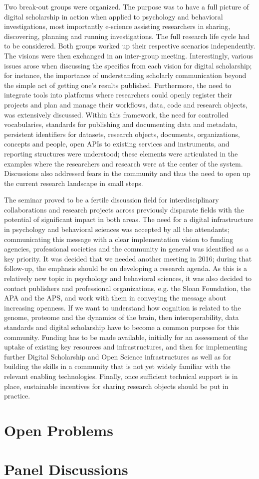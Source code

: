 \documentclass[a4paper,UKenglish]{dagrep}
\begin{document}
Two break-out groups were organized. The purpose was to have a full picture of
digital scholarship in action when applied to psychology and behavioral
investigations, most importantly e-science assisting researchers in sharing,
discovering, planning and running investigations. The full research life cycle
had to be considered. Both groups worked up their respective scenarios
independently. The visions were then exchanged in an inter-group meeting.
Interestingly, various issues arose when discussing the specifics from each
vision for digital scholarship; for instance, the importance of understanding
scholarly communication beyond the simple act of getting one's results
published. Furthermore, the need to integrate tools into platforms where
researchers could openly register their projects and plan and manage their
workflows, data, code and research objects, was extensively discussed. Within
this framework, the need for controlled vocabularies, standards for publishing
and documenting data and metadata, persistent identifiers for datasets, research
objects, documents, organizations, concepts and people, open APIs to existing
services and instruments, and reporting structures were understood; these
elements were articulated in the examples where the researchers and research
were at the center of the system. Discussions also addressed fears in the
community and thus the need to open up the current research landscape in small
steps.

The seminar proved to be a fertile discussion field for interdisciplinary
collaborations and research projects across previously disparate fields with the
potential of significant impact in both areas. The need for a digital
infrastructure in psychology and behavioral sciences was accepted by all the
attendants; communicating this message with a clear implementation vision to
funding agencies, professional societies and the community in general was
identified as a key priority. It was decided that we needed another meeting in
2016; during that follow-up, the emphasis should be on developing a research
agenda. As this is a relatively new topic in psychology and behavioral sciences,
it was also decided to contact publishers and professional organizations, e.g.
the Sloan Foundation, the APA and the APS, and work with them in conveying the
message about increasing openness. If we want to understand how cognition is
related to the genome, proteome and the dynamics of the brain, then
interoperability, data standards and digital scholarship have to become a common
purpose for this community. Funding has to be made available, initially for an
assessment of the uptake of existing key resources and infrastructures, and then
for implementing further Digital Scholarship and Open Science infrastructures as
well as for building the skills in a community that is not yet widely familiar
with the relevant enabling technologies. Finally, once sufficient technical
support is in place, sustainable incentives for sharing research objects should
be put in practice.

\section{Open Problems}

\section{Panel Discussions}

 
\end{document}
